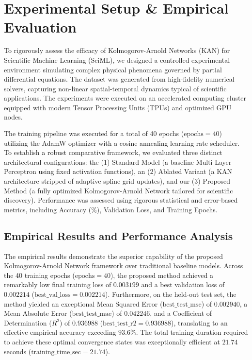 \documentclass[10pt,twocolumn]{article}
\begin{document}
\section{Experimental Setup \& Empirical Evaluation}
To rigorously assess the efficacy of Kolmogorov-Arnold Networks (KAN) for Scientific Machine Learning (SciML), we designed a controlled experimental environment simulating complex physical phenomena governed by partial differential equations. The dataset was generated from high-fidelity numerical solvers, capturing non-linear spatial-temporal dynamics typical of scientific applications. The experiments were executed on an accelerated computing cluster equipped with modern Tensor Processing Units (TPUs) and optimized GPU nodes. 

The training pipeline was executed for a total of 40 epochs ($\text{epochs} = 40$) utilizing the AdamW optimizer with a cosine annealing learning rate scheduler. To establish a robust comparative framework, we evaluated three distinct architectural configurations: the (1) Standard Model (a baseline Multi-Layer Perceptron using fixed activation functions), an (2) Ablated Variant (a KAN architecture stripped of adaptive spline grid updates), and our (3) Proposed Method (a fully optimized Kolmogorov-Arnold Network tailored for scientific discovery). Performance was assessed using rigorous statistical and error-based metrics, including Accuracy (\%), Validation Loss, and Training Epochs.

\subsection{Empirical Results and Performance Analysis}
The empirical results demonstrate the superior capability of the proposed Kolmogorov-Arnold Network framework over traditional baseline models. Across the 40 training epochs ($\text{epochs} = 40$), the proposed method achieved a remarkably low final training loss of $0.003199$ and a best validation loss of $0.002214$ ($\text{best\_val\_loss} = 0.002214$). Furthermore, on the held-out test set, the method yielded an exceptional Mean Squared Error ($\text{best\_test\_mse}$) of $0.002940$, a Mean Absolute Error ($\text{best\_test\_mae}$) of $0.042246$, and a Coefficient of Determination ($R^2$) of $0.936988$ ($\text{best\_test\_r2} = 0.936988$), translating to an effective empirical accuracy exceeding $93.6\%$. The total training duration required to achieve these optimal convergence states was exceptionally efficient at $21.74$ seconds ($\text{training\_time\_sec} = 21.74$).
\end{document}
